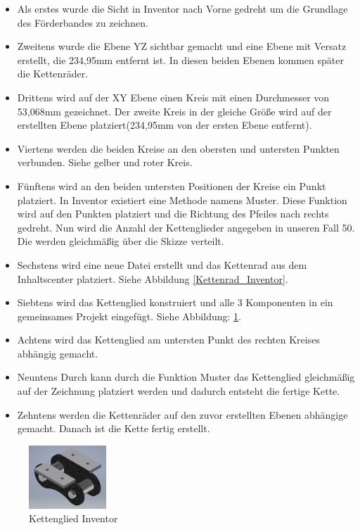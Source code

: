 \begin{itemize}
\item[1] Als erstes wurde die Sicht in Inventor nach Vorne gedreht um die Grundlage des Förderbandes zu zeichnen.
\item[2] Zweitens wurde die Ebene YZ sichtbar gemacht und eine Ebene mit Versatz erstellt, die 234,95mm entfernt ist. In diesen beiden Ebenen kommen später die Kettenräder.
\item[3] Drittens wird auf der XY Ebene einen Kreis mit einen Durchmesser von 53,068mm gezeichnet. Der zweite Kreis in der gleiche Größe wird auf der erstellten Ebene platziert(234,95mm von der ersten Ebene entfernt). 
\item[4] Viertens werden die beiden Kreise an den obersten und untersten Punkten verbunden. Siehe gelber und roter Kreis.
\item[5] Fünftens wird an den beiden untersten Positionen der Kreise ein Punkt platziert. In Inventor existiert eine Methode namens Muster. Diese Funktion wird auf den Punkten platziert und die Richtung des Pfeiles nach rechts gedreht. Nun wird die Anzahl der Kettenglieder angegeben in unseren Fall 50. Die werden gleichmäßig über die Skizze verteilt.
\item[6] Sechstens wird eine neue Datei erstellt und das Kettenrad aus dem Inhaltscenter platziert. Siehe Abbildung \ref{Kettenrad_Inventor}.
\item[7] Siebtens wird das Kettenglied konstruiert und alle 3 Komponenten in ein gemeinsames Projekt eingefügt. Siehe Abbildung: \ref{Kettenglied_Inventor}.
\item[8] Achtens wird das Kettenglied am untersten Punkt des rechten Kreises abhängig gemacht.
\item[9] Neuntens Durch kann durch die Funktion Muster das Kettenglied gleichmäßig auf der Zeichnung platziert werden und dadurch entsteht die fertige Kette.
\item[10] Zehntens werden die Kettenräder auf den zuvor erstellten Ebenen abhängige gemacht. Danach ist die Kette fertig erstellt.\\
\end{itemize} 

\begin{figure}
\vspace{-20pt}
  \begin{center}
    \includegraphics[width=0.26\textwidth]{Bilder/Inventor/Kettenglied}
  \end{center}
  \caption{Kettenglied Inventor}
  \label{Kettenglied_Inventor}
  \vspace{-20pt}
\end{figure}

